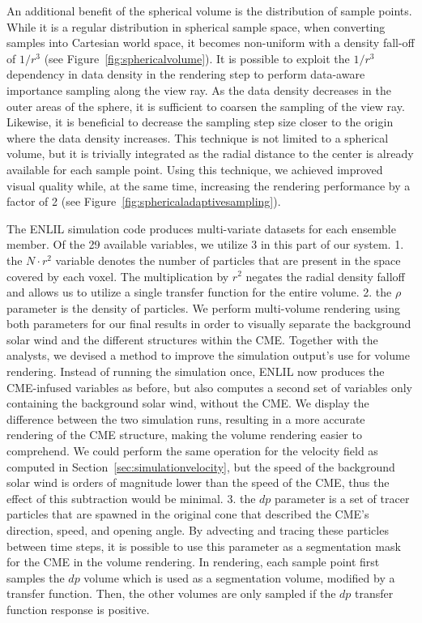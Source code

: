 \documentclass[journal]{vgtc}                %
\begin{document}
 An additional benefit of the spherical volume is the distribution of sample points. While it is a regular distribution in spherical sample space, when converting samples into Cartesian world space, it becomes non-uniform with a density fall-off of $1/r^3$ (see Figure~\ref{fig:sphericalvolume}). It is possible to exploit the $1/r^3$ dependency in data density in the rendering step to perform data-aware importance sampling along the view ray. As the data density decreases in the outer areas of the sphere, it is sufficient to coarsen the sampling of the view ray. Likewise, it is beneficial to decrease the sampling step size closer to the origin where the data density increases. This technique is not limited to a spherical volume, but it is trivially integrated as the radial distance to the center is already available for each sample point. Using this technique, we achieved improved visual quality while, at the same time, increasing the rendering performance by a factor of 2 (see Figure~\ref{fig:sphericaladaptivesampling}).

 The ENLIL simulation code produces multi-variate datasets for each ensemble member. Of the 29 available variables, we utilize 3 in this part of our system. 1. the $N \cdot r^2$ variable denotes the number of particles that are present in the space covered by each voxel. The multiplication by $r^2$ negates the radial density falloff and allows us to utilize a single transfer function for the entire volume. 2. the $\rho$ parameter is the density of particles. We perform multi-volume rendering using both parameters for our final results in order to visually separate the background solar wind and the different structures within the CME. Together with the analysts, we devised a method to improve the simulation output's use for volume rendering. Instead of running the simulation once, ENLIL now produces the CME-infused variables as before, but also computes a second set of variables only containing the background solar wind, without the CME. We display the difference between the two simulation runs, resulting in a more accurate rendering of the CME structure, making the volume rendering easier to comprehend. We could perform the same operation for the velocity field as computed in Section~\ref{sec:simulationvelocity}, but the speed of the background solar wind is orders of magnitude lower than the speed of the CME, thus the effect of this subtraction would be minimal. 3. the $dp$ parameter is a set of tracer particles that are spawned in the original cone that described the CME's direction, speed, and opening angle. By advecting and tracing these particles between time steps, it is possible to use this parameter as a segmentation mask for the CME in the volume rendering. In rendering, each sample point first samples the $dp$ volume which is used as a segmentation volume, modified by a transfer function. Then, the other volumes are only sampled if the $dp$ transfer function response is positive.
\end{document}
